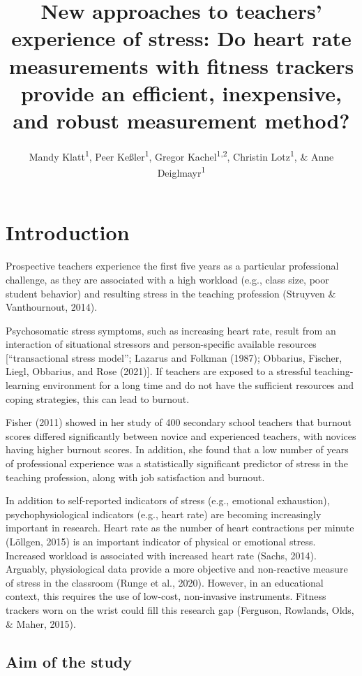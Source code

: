 \documentclass[
  man]{apa6}
\title{New approaches to teachers' experience of stress: Do heart rate measurements with fitness trackers provide an efficient, inexpensive, and robust measurement method?}
\author{Mandy Klatt\textsuperscript{1}, Peer Keßler\textsuperscript{1}, Gregor Kachel\textsuperscript{1,2}, Christin Lotz\textsuperscript{1}, \& Anne Deiglmayr\textsuperscript{1}}
\date{}
\affiliation{\vspace{0.5cm}\textsuperscript{1} Leipzig University\\\textsuperscript{2} Max Planck Institute for Evolutionary Anthropology}
\begin{document}
\maketitle

\hypertarget{introduction}{%
\section{Introduction}\label{introduction}}

Prospective teachers experience the first five years as a particular professional challenge, as they are associated with a high workload (e.g., class size, poor student behavior) and resulting stress in the teaching profession (Struyven \& Vanthournout, 2014).

Psychosomatic stress symptoms, such as increasing heart rate, result from an interaction of situational stressors and person-specific available resources {[}``transactional stress model''; Lazarus and Folkman (1987); Obbarius, Fischer, Liegl, Obbarius, and Rose (2021){]}. If teachers are exposed to a stressful teaching-learning environment for a long time and do not have the sufficient resources and coping strategies, this can lead to burnout.

Fisher (2011) showed in her study of 400 secondary school teachers that burnout scores differed significantly between novice and experienced teachers, with novices having higher burnout scores. In addition, she found that a low number of years of professional experience was a statistically significant predictor of stress in the teaching profession, along with job satisfaction and burnout.

In addition to self-reported indicators of stress (e.g., emotional exhaustion), psychophysiological indicators (e.g., heart rate) are becoming increasingly important in research. Heart rate as the number of heart contractions per minute (Löllgen, 2015) is an important indicator of physical or emotional stress. Increased workload is associated with increased heart rate (Sachs, 2014). Arguably, physiological data provide a more objective and non-reactive measure of stress in the classroom (Runge et al., 2020). However, in an educational context, this requires the use of low-cost, non-invasive instruments. Fitness trackers worn on the wrist could fill this research gap (Ferguson, Rowlands, Olds, \& Maher, 2015).

\hypertarget{aim-of-the-study}{%
\subsection{Aim of the study}\label{aim-of-the-study}}
\end{document}
